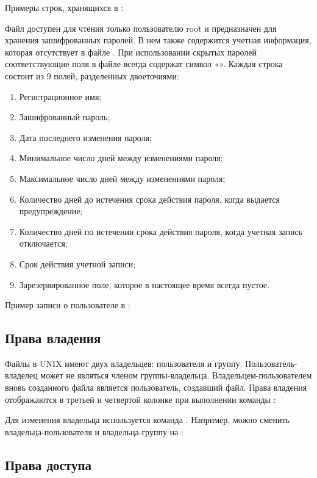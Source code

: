 Примеры строк, хранящихся в :


Файл  доступен для чтения только пользователю root и предназначен для хранения зашифрованных паролей. В нем также содержится учетная информация, которая отсутствует в файле . При использовании скрытых паролей соответствующие поля в файле  всегда содержат символ «». Каждая строка состоит из 9 полей, разделенных двоеточиями:
\begin{enumerate}
	\item Регистрационное имя;
	\item Зашифрованный пароль;
	\item Дата последнего изменения пароля;
	\item Минимальное число дней между изменениями пароля;
	\item Максимальное число дней между изменениями пароля;
	\item Количество дней до истечения срока действия пароля, когда выдается предупреждение;
	\item Количество дней по истечении срока действия пароля, когда учетная запись отключается;
	\item Срок действия учетной записи;
	\item Зарезервированное поле, которое в настоящее время всегда пустое.
\end{enumerate}

Пример записи о пользователе в :


\subsection{Права владения}

Файлы в UNIX имеют двух владельцев: пользователя и группу. Пользователь-владелец может не являться членом группы-владельца. Владельцем-пользователем вновь созданного файла является пользователь, создавший файл. Права владения отображаются в третьей и четвертой колонке при выполнении команды :


Для изменения владельца используется команда . Например, можно сменить владельца-пользователя и владельца-группу на :


\subsection{Права доступа}


